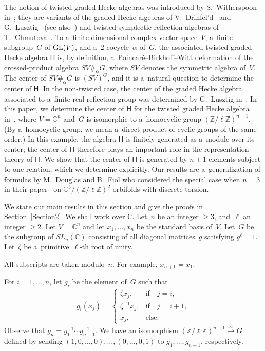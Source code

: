 \documentclass[pdftex]{sigma}
\numberwithin{equation}{section}
\begin{document}
The notion of twisted graded Hecke algebras was introduced by S.~Witherspoon in~\cite{W}; they are variants of the
graded Hecke algebras of V.~Drinfel'd~\cite{Dr} and G.~Lusztig~\cite{Lu2} (see also~\cite{RS}) and twisted symplectic
ref\/lection algebras of T.~Chmutova~\cite{Ch}.
To a~f\/inite dimensional complex vector space~$V$, a~f\/inite subgroup~$G$ of ${\rm GL}(V)$, and a~$2$-cocycle~$\alpha$ of~$G$,
the associated twisted graded Hecke algebra $\mathsf{H}$ is, by def\/inition, a~Poincar\'e--Birkhof\/f--Witt deformation of
the crossed-product algebra $SV\#_\alpha G$, where $SV$ denotes the symmetric algebra of~$V$.
The center of $SV\#_\alpha G$ is $(SV)^G$, and it is a~natural question to determine the center of $\mathsf{H}$.
In the non-twisted case, the center of the graded Hecke algebra associated to a~f\/inite real ref\/lection group was
determined by G.~Lusztig in~\cite[Theorem~6.5]{Lu1}.
In this paper, we determine the center of $\mathsf{H}$ for the twisted graded Hecke algebra in~\cite[Example~2.16]{W},
where $V={\mathbb{C}}^n$ and~$G$ is isomorphic to a~homocyclic group $({\mathbb{Z}}/\ell{\mathbb{Z}})^{n-1}$.
(By a~homocyclic group, we mean a~direct product of cyclic groups of the same order.) In this example, the algebra
$\mathsf{H}$ is f\/initely generated as a~module over its center; the center of $\mathsf{H}$ therefore plays an important
role in the representation theory of $\mathsf{H}$.
We show that the center of $\mathsf{H}$ is generated by $n+1$ elements subject to one relation, which we determine
explicitly.
Our results are a~generalization of formulas by M.~Douglas and B.~Fiol who considered the special case when $n=3$ in
their paper~\cite{DF} on ${\mathbb{C}}^3/({\mathbb{Z}}/\ell{\mathbb{Z}})^2$ orbifolds with discrete torsion.

We state our main results in this section and give the proofs in Section~\ref{Section2}.
We shall work over ${\mathbb{C}}$.
Let~$n$ be an integer $\ge 3$, and~$\ell$ an integer $\ge 2$.
Let $V={\mathbb{C}}^n$ and let $x_1,\ldots, x_n$ be the standard basis of~$V$.
Let~$G$ be the subgroup of $SL_n({\mathbb{C}})$ consisting of all diagonal matrices~$g$ satisfying $g^\ell =1$.
Let~$\zeta$ be a~primitive~$\ell$-th root of unity.

\begin{Notation}
All subscripts are taken modulo~$n$.
For example, $x_{n+1}=x_1$.
\end{Notation}

For $i=1,\dots, n$, let $g_i$ be the element of~$G$ such that
\begin{gather*}
g_i (x_j) =
\begin{cases}
\zeta x_j, & \text{if} \quad j=i,
\\
\zeta^{-1} x_j, & \text{if} \quad j=i+1,
\\
x_j, & \mbox {else}.
\end{cases}
\end{gather*}
Observe that $g_n=g_1^{-1}\cdots g_{n-1}^{-1}$.
We have an isomorphism $({\mathbb{Z}}/\ell{\mathbb{Z}})^{n-1} \overset{\sim}{\longrightarrow} G$ def\/ined by sending
$(1,0,\dots,0),\ldots, (0,\ldots, 0,1)$ to $g_1,\dots, g_{n-1}$, respectively.
\end{document}

